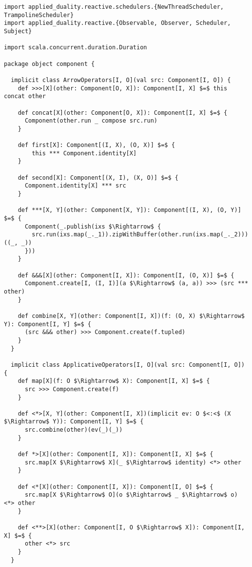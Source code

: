 \begin{lstlisting}[style=ScalaStyle, caption={Operators on \comp}, label={lst:component-operators}]
import applied_duality.reactive.schedulers.{NewThreadScheduler, TrampolineScheduler}
import applied_duality.reactive.{Observable, Observer, Scheduler, Subject}

import scala.concurrent.duration.Duration

package object component {

  implicit class ArrowOperators[I, O](val src: Component[I, O]) {
    def >>>[X](other: Component[O, X]): Component[I, X] $=$ this concat other

    def concat[X](other: Component[O, X]): Component[I, X] $=$ {
      Component(other.run _ compose src.run)
    }

    def first[X]: Component[(I, X), (O, X)] $=$ {
      	this *** Component.identity[X]
    }

    def second[X]: Component[(X, I), (X, O)] $=$ {
      Component.identity[X] *** src
    }

    def ***[X, Y](other: Component[X, Y]): Component[(I, X), (O, Y)] $=$ {
      Component(_.publish(ixs $\Rightarrow$ {
        src.run(ixs.map(_._1)).zipWithBuffer(other.run(ixs.map(_._2)))((_, _))
      }))
    }

    def &&&[X](other: Component[I, X]): Component[I, (O, X)] $=$ {
      Component.create[I, (I, I)](a $\Rightarrow$ (a, a)) >>> (src *** other)
    }

    def combine[X, Y](other: Component[I, X])(f: (O, X) $\Rightarrow$ Y): Component[I, Y] $=$ {
      (src &&& other) >>> Component.create(f.tupled)
    }
  }
  
  implicit class ApplicativeOperators[I, O](val src: Component[I, O]) {
    def map[X](f: O $\Rightarrow$ X): Component[I, X] $=$ {
      src >>> Component.create(f)
    }

    def <*>[X, Y](other: Component[I, X])(implicit ev: O $<:<$ (X $\Rightarrow$ Y)): Component[I, Y] $=$ {
      src.combine(other)(ev(_)(_))
    }

    def *>[X](other: Component[I, X]): Component[I, X] $=$ {
      src.map[X $\Rightarrow$ X](_ $\Rightarrow$ identity) <*> other
    }

    def <*[X](other: Component[I, X]): Component[I, O] $=$ {
      src.map[X $\Rightarrow$ O](o $\Rightarrow$ _ $\Rightarrow$ o) <*> other
    }

    def <**>[X](other: Component[I, O $\Rightarrow$ X]): Component[I, X] $=$ {
      other <*> src
    }
  }
  

\end{lstlisting}
